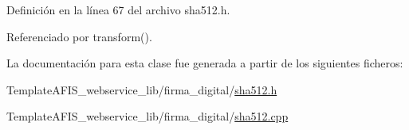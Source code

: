 Definición en la línea 67 del archivo sha512.\+h.



Referenciado por transform().



La documentación para esta clase fue generada a partir de los siguientes ficheros\+:\begin{DoxyCompactItemize}
\item 
Template\+A\+F\+I\+S\+\_\+webservice\+\_\+lib/firma\+\_\+digital/\hyperlink{sha512_8h}{sha512.\+h}\item 
Template\+A\+F\+I\+S\+\_\+webservice\+\_\+lib/firma\+\_\+digital/\hyperlink{sha512_8cpp}{sha512.\+cpp}\end{DoxyCompactItemize}
